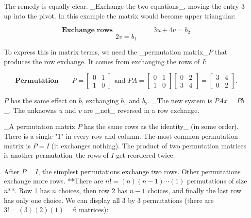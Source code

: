 The remedy is equally clear. _Exchange the two equations_, moving the entry 3 up into the pivot. In this example the matrix would become upper triangular:

\[\textbf{Exchange rows}\qquad\qquad\qquad 3u+4v = b_{2}\] \[2v = b_{1}\]

To express this in matrix terms, we need the _permutation matrix_\(P\) that produces the row exchange. It comes from exchanging the rows of \(I\):

\[\textbf{Permutation}\qquad P=\begin{bmatrix}0&1\\ 1&0\end{bmatrix}\text{ and }PA=\begin{bmatrix}0&1\\ 1&0\end{bmatrix}\begin{bmatrix}0&2\\ 3&4\end{bmatrix}=\begin{bmatrix}3&4\\ 0&2\end{bmatrix}.\]

\(P\) has the same effect on \(b\), exchanging \(b_{1}\) and \(b_{2}\). _The new system is \(PAx=Pb\)_. The unknowns \(u\) and \(v\) are _not_ reversed in a row exchange.

_A permutation matrix \(P\) has the same rows as the identity_ (in some order). There is a single "1" in every row and column. The most common permutation matrix is \(P=I\) (it exchanges nothing). The product of two permutation matrices is another permutation--the rows of \(I\) get reordered twice.

After \(P=I\), the simplest permutations exchange two rows. Other permutations exchange more rows. **There are \(n!=(n)(n-1)\cdots(1)\) permutations of size \(n\)**. Row 1 has \(n\) choices, then row 2 has \(n-1\) choices, and finally the last row has only one choice. We can display all 3 by 3 permutations (there are \(3!=(3)(2)(1)=6\) matrices):

